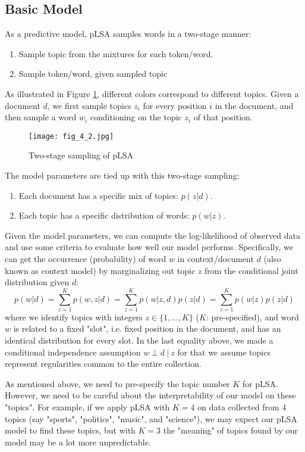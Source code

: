 \documentclass[../book-template.tex]{subfiles}
\begin{document}
\subsection{Basic Model}
As a predictive model, pLSA samples words in a two-stage manner:
\begin{enumerate}
	\item Sample topic from the mixtures for each token/word.
	\item Sample token/word, given sampled topic
\end{enumerate}
\par As illustrated in Figure \ref{fig_4_2}, different colors correspond to different topics. Given a document $d$, we first sample topics $z_i$ for every position $i$ in the document, and then sample a word $w_i$ conditioning on the topic $z_i$ of that position.
\begin{figure}[h] 
	\centering 
	\texttt{[image: fig\_4\_2.jpg]} 
	\caption{Two-stage sampling of pLSA}\label{fig_4_2}
\end{figure}
\par The model parameters are tied up with this two-stage sampling:
\begin{enumerate}
	\item Each document has a specific mix of topics: $p(z|d)$.
	\item Each topic has a specific distribution of words: $p(w|z)$.
\end{enumerate}
\par Given the model parameters, we can compute the log-likelihood of observed data and use some criteria to evaluate how well our model performs. Specifically, we can get the occurrence (probability) of word $w$ in context/document $d$ (also known as context model) by marginalizing out topic $z$ from the conditional joint distribution given $d$:
\begin{equation}\label{eq_4_word_prob}
	p(w|d)=\sum_{z=1}^{K}p(w,z|d)=\sum_{z=1}^{K}p(w|z,d)p(z|d) = \sum_{z=1}^{K}p(w|z)p(z|d)
\end{equation}
where we identify topics with integers $z\in \{1,\dots,K\}$ ($K$: pre-specified), and word $w$ is related to a fixed "slot", i.e. fixed position in the document, and has an identical distribution for every slot. In the last equality above, we made a conditional independence assumption $w\perp d\ |\ z$ for that we assume topics represent regularities common to the entire collection.
\begin{remark}
	As mentioned above, we need to pre-specify the topic number $K$ for pLSA. However, we need to be careful about the interpretability of our model on these "topics". For example, if we apply pLSA with $K=4$ on data collected from 4 topics (say "sports", "politics", "music", and "science"), we may expect our pLSA model to find these topics, but with $K=3$ the "meaning" of topics found by our model may be a lot more unpredictable. 
\end{remark}
\end{document}
